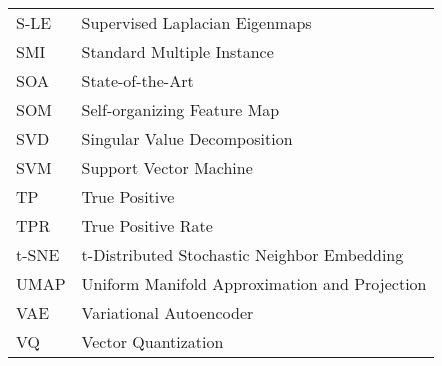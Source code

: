 \begin{longtable}{l p{5in}}
S-LE & Supervised Laplacian Eigenmaps\\
SMI& Standard Multiple Instance\\
SOA & State-of-the-Art\\
SOM & Self-organizing Feature Map\\
SVD & Singular Value Decomposition\\
SVM & Support Vector Machine\\
TP & True Positive\\
TPR & True Positive Rate\\
t-SNE & t-Distributed Stochastic Neighbor Embedding\\
UMAP & Uniform Manifold Approximation and Projection\\
VAE & Variational Autoencoder\\
VQ & Vector Quantization\\

 \end{longtable}



\doublespacing


